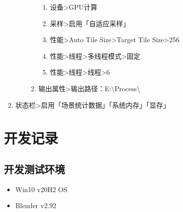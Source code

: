 \documentclass{../../PublicResources/DocClass}
\begin{document}
\begin{enumerate}
\begin{enumerate}
\begin{enumerate}
\begin{enumerate}
                    \item 设备>GPU计算
                    \item 采样>启用「自适应采样」
                    \item 性能>Auto Tile Size>Target Tile Size>256
                    \item 性能>线程>多线程模式>固定
                    \item 性能>线程>线程>6
                \end{enumerate}
                \item 输出属性>输出路径：E:\textbackslash Process\textbackslash
            \end{enumerate}
        \end{enumerate}
        \item 状态栏>启用「场景统计数据」「系统内存」「显存」
    \end{enumerate}

    \section{开发记录}
    \subsection{开发测试环境}
    \begin{itemize}
        \item Win10 v20H2 OS
        \item Blender v2.92
    \end{itemize}
\end{document}
